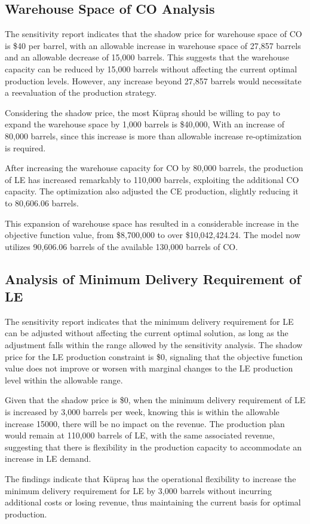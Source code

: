 \documentclass[12pt]{article}
\begin{document}

\subsection*{Warehouse Space of CO Analysis}

The sensitivity report indicates that the shadow price for warehouse space of CO is \$40 per barrel, with an allowable increase in warehouse space of 27,857 barrels and an allowable decrease of 15,000 barrels. This suggests that the warehouse capacity can be reduced by 15,000 barrels without affecting the current optimal production levels. However, any increase beyond 27,857 barrels would necessitate a reevaluation of the production strategy.

Considering the shadow price, the most Küpraş should be willing to pay to expand the warehouse space by 1,000 barrels is \$40,000, With an increase of 80,000 barrels, since this increase is more than allowable increase re-optimization is required.

After increasing the warehouse capacity for CO by 80,000 barrels, the production of LE has increased remarkably to 110,000 barrels, exploiting the additional CO capacity. The optimization also adjusted the CE production, slightly reducing it to 80,606.06 barrels.

This expansion of warehouse space has resulted in a considerable increase in the objective function value, from \$8,700,000 to over \$10,042,424.24. The model now utilizes 90,606.06 barrels of the available 130,000 barrels of CO.




\subsection*{Analysis of Minimum Delivery Requirement of LE}

The sensitivity report indicates that the minimum delivery requirement for LE can be adjusted without affecting the current optimal solution, as long as the adjustment falls within the range allowed by the sensitivity analysis. The shadow price for the LE production constraint is \$0, signaling that the objective function value does not improve or worsen with marginal changes to the LE production level within the allowable range.

Given that the shadow price is \$0, when the minimum delivery requirement of LE is increased by 3,000 barrels per week, knowing this is within the allowable increase 15000, there will be no impact on the revenue. The production plan would remain at 110,000 barrels of LE, with the same associated revenue, suggesting that there is flexibility in the production capacity to accommodate an increase in LE demand.

The findings indicate that Küpraş has the operational flexibility to increase the minimum delivery requirement for LE by 3,000 barrels without incurring additional costs or losing revenue, thus maintaining the current basis for optimal production.

\end{document}
